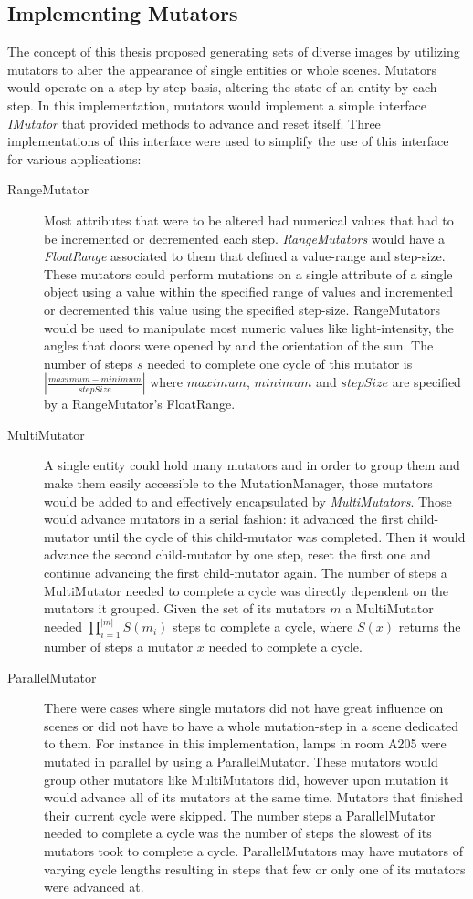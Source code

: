 \subsection{Implementing Mutators}
The concept of this thesis proposed generating sets of diverse images by utilizing mutators to alter the appearance of single entities or whole scenes. Mutators would operate on a step-by-step basis, altering the state of an entity by each step. In this implementation, mutators would implement a simple interface \textit{IMutator} that provided methods to advance and reset itself. Three implementations of this interface were used to simplify the use of this interface for various applications: 
\begin{description}
\item [RangeMutator] Most attributes that were to be altered had numerical values that had to be incremented or decremented each step. \textit{RangeMutators} would have a \textit{FloatRange} associated to them that defined a value-range and step-size. These mutators could perform mutations on a single attribute of a single object using a value within the specified range of values and incremented or decremented this value using the specified step-size. RangeMutators would be used to manipulate most numeric values like light-intensity, the angles that doors were opened by and the orientation of the sun. The number of steps $s$ needed to complete one cycle of this mutator is $|\frac{maximum-minimum}{stepSize}|$ where $maximum$, $minimum$ and $stepSize$ are specified by a RangeMutator's FloatRange.
\item [MultiMutator] A single entity could hold many mutators and in order to group them and make them easily accessible to the MutationManager, those mutators would be added to and effectively encapsulated by \textit{MultiMutators}. Those would advance mutators in a serial fashion: it advanced the first child-mutator until the cycle of this child-mutator was completed. Then it would advance the second child-mutator by one step, reset the first one and continue advancing the first child-mutator again. The number of steps a MultiMutator needed to complete a cycle was directly dependent on the mutators it grouped. Given the set of its mutators $m$ a MultiMutator needed $\prod_{i=1}^{|m|} S(m_i)$ steps to complete a cycle, where $S(x)$ returns the number of steps a mutator $x$ needed to complete a cycle.
\item [ParallelMutator] There were cases where single mutators did not have great influence on scenes or did not have to have a whole mutation-step in a scene dedicated to them. For instance in this implementation, lamps in room A205 were mutated in parallel by using a ParallelMutator. These mutators would group other mutators like MultiMutators did, however upon mutation it would advance all of its mutators at the same time. Mutators that finished their current cycle were skipped. The number steps a ParallelMutator needed to complete a cycle was the number of steps the slowest of its mutators took to complete a cycle. ParallelMutators may have mutators of varying cycle lengths resulting in steps that few or only one of its mutators were advanced at.
\end{description}
